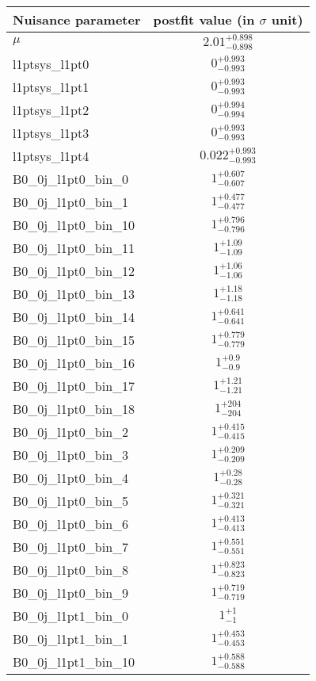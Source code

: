 
\begin{tabular}{|l|c|}
\hline
Nuisance parameter & postfit value (in $\sigma$ unit) \\\hline
$\mu$ & $2.01^{+0.898}_{-0.898}$ \\
l1ptsys\_l1pt0 & $0^{+0.993}_{-0.993}$ \\
l1ptsys\_l1pt1 & $0^{+0.993}_{-0.993}$ \\
l1ptsys\_l1pt2 & $0^{+0.994}_{-0.994}$ \\
l1ptsys\_l1pt3 & $0^{+0.993}_{-0.993}$ \\
l1ptsys\_l1pt4 & $0.022^{+0.993}_{-0.993}$ \\
B0\_0j\_l1pt0\_bin\_0 & $1^{+0.607}_{-0.607}$ \\
B0\_0j\_l1pt0\_bin\_1 & $1^{+0.477}_{-0.477}$ \\
B0\_0j\_l1pt0\_bin\_10 & $1^{+0.796}_{-0.796}$ \\
B0\_0j\_l1pt0\_bin\_11 & $1^{+1.09}_{-1.09}$ \\
B0\_0j\_l1pt0\_bin\_12 & $1^{+1.06}_{-1.06}$ \\
B0\_0j\_l1pt0\_bin\_13 & $1^{+1.18}_{-1.18}$ \\
B0\_0j\_l1pt0\_bin\_14 & $1^{+0.641}_{-0.641}$ \\
B0\_0j\_l1pt0\_bin\_15 & $1^{+0.779}_{-0.779}$ \\
B0\_0j\_l1pt0\_bin\_16 & $1^{+0.9}_{-0.9}$ \\
B0\_0j\_l1pt0\_bin\_17 & $1^{+1.21}_{-1.21}$ \\
B0\_0j\_l1pt0\_bin\_18 & $1^{+204}_{-204}$ \\
B0\_0j\_l1pt0\_bin\_2 & $1^{+0.415}_{-0.415}$ \\
B0\_0j\_l1pt0\_bin\_3 & $1^{+0.209}_{-0.209}$ \\
B0\_0j\_l1pt0\_bin\_4 & $1^{+0.28}_{-0.28}$ \\
B0\_0j\_l1pt0\_bin\_5 & $1^{+0.321}_{-0.321}$ \\
B0\_0j\_l1pt0\_bin\_6 & $1^{+0.413}_{-0.413}$ \\
B0\_0j\_l1pt0\_bin\_7 & $1^{+0.551}_{-0.551}$ \\
B0\_0j\_l1pt0\_bin\_8 & $1^{+0.823}_{-0.823}$ \\
B0\_0j\_l1pt0\_bin\_9 & $1^{+0.719}_{-0.719}$ \\
B0\_0j\_l1pt1\_bin\_0 & $1^{+1}_{-1}$ \\
B0\_0j\_l1pt1\_bin\_1 & $1^{+0.453}_{-0.453}$ \\
B0\_0j\_l1pt1\_bin\_10 & $1^{+0.588}_{-0.588}$ \\

\end{tabular}
